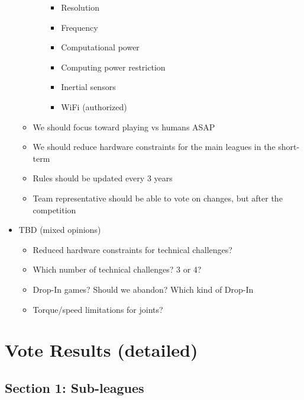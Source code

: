 \documentclass{article}
\begin{document}
\begin{itemize}
\begin{itemize}
\begin{itemize}
\begin{itemize}
               \item Resolution
               \item Frequency
               \item Computational power
               \item Computing power restriction
               \item Inertial sensors
               \item WiFi (authorized)
   \end{itemize}
   \end{itemize}
       \item We should focus toward playing vs humans ASAP
       \item We should reduce hardware constraints for the main leagues in the short-term
       \item Rules should be updated every 3 years
       \item Team representative should be able to vote on changes, but after the competition
\end{itemize}
   \item TBD (mixed opinions)
   \begin{itemize} 
       \item Reduced hardware constraints for technical challenges?
       \item Which number of technical challenges? 3 or 4?
       \item Drop-In games? Should we abandon? Which kind of Drop-In
       \item Torque/speed limitations for joints?
   \end{itemize}

\end{itemize}
\section{Vote Results (detailed)}
\subsection{Section 1: Sub-leagues}
\end{document}

